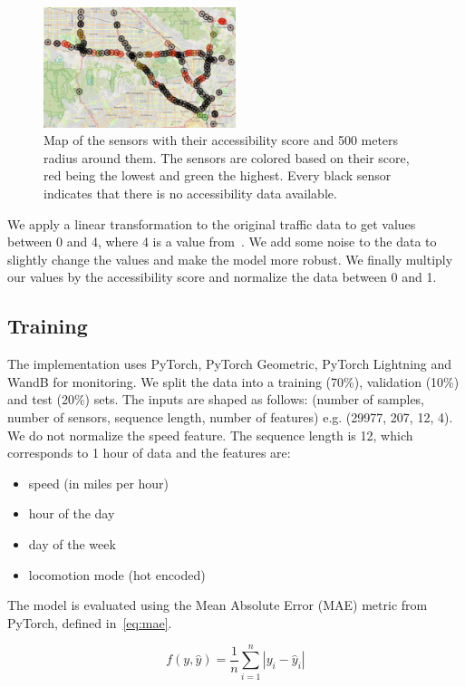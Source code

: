 \begin{figure}[htbp]
    \centering
    \includegraphics[width=0.5\textwidth]{resources/map}
    \caption{
        Map of the sensors with their accessibility score and 500 meters radius around them.
        The sensors are colored based on their score, red being the lowest and green the highest.
        Every black sensor indicates that there is no accessibility data available.
    }
    \label{fig:map}
\end{figure}

We apply a linear transformation to the original traffic data to get values between 0 and 4, where 4 is a value from~\cite{FreedomMobility}.
We add some noise to the data to slightly change the values and make the model more robust.
We finally multiply our values by the accessibility score and normalize the data between 0 and 1.

\subsection{Training}\label{subsec:training}
The implementation uses PyTorch, PyTorch Geometric, PyTorch Lightning and WandB for monitoring.
We split the data into a training (70\%), validation (10\%) and test (20\%) sets.
The inputs are shaped as follows: (number of samples, number of sensors, sequence length, number of features) e.g. (29977, 207, 12, 4).
We do not normalize the speed feature.
The sequence length is 12, which corresponds to 1 hour of data and the features are:

\begin{itemize}
    \item speed (in miles per hour)
    \item hour of the day
    \item day of the week
    \item locomotion mode (hot encoded)
\end{itemize}

The model is evaluated using the Mean Absolute Error (MAE) metric from PyTorch, defined in~\eqref{eq:mae}.

\begin{equation}
    f(y, \hat{y}) = \frac{1}{n} \sum_{i=1}^{n} \left| y_i - \hat{y}_i \right|\label{eq:mae}
\end{equation}